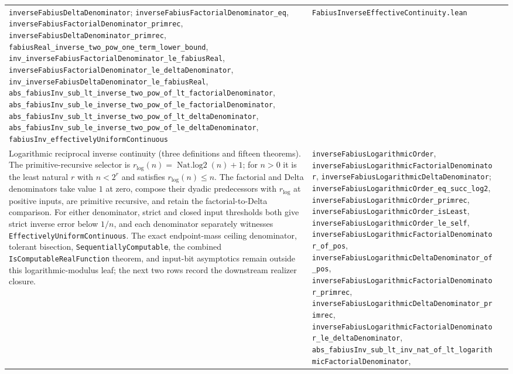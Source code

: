 \documentclass[11pt,oneside]{article}
\theoremstyle{definition}
\theoremstyle{remark}
\begin{document}
\begin{longtable}{@{}p{}p{}p{}@{}}
\nolinkurl{inverseFabiusDeltaDenominator};
\nolinkurl{inverseFabiusFactorialDenominator_eq},
\nolinkurl{inverseFabiusFactorialDenominator_primrec},
\nolinkurl{inverseFabiusDeltaDenominator_primrec},
\nolinkurl{fabiusReal_inverse_two_pow_one_term_lower_bound},
\nolinkurl{inv_inverseFabiusFactorialDenominator_le_fabiusReal},
\nolinkurl{inverseFabiusFactorialDenominator_le_deltaDenominator},
\nolinkurl{inv_inverseFabiusDeltaDenominator_le_fabiusReal},
\nolinkurl{abs_fabiusInv_sub_lt_inverse_two_pow_of_lt_factorialDenominator},
\nolinkurl{abs_fabiusInv_sub_le_inverse_two_pow_of_le_factorialDenominator},
\nolinkurl{abs_fabiusInv_sub_lt_inverse_two_pow_of_lt_deltaDenominator},
\nolinkurl{abs_fabiusInv_sub_le_inverse_two_pow_of_le_deltaDenominator},
\nolinkurl{fabiusInv_effectivelyUniformContinuous} &
\nolinkurl{FabiusInverseEffectiveContinuity.lean} \\
Logarithmic reciprocal inverse continuity (three definitions and fifteen
theorems).  The primitive-recursive selector is
\(r_{\log}(n)=\operatorname{Nat.log2}(n)+1\); for \(n>0\) it is the least
natural \(r\) with \(n<2^r\) and satisfies \(r_{\log}(n)\le n\).  The
factorial and Delta denominators take value \(1\) at zero, compose their
dyadic predecessors with \(r_{\log}\) at positive inputs, are primitive
recursive, and retain the factorial-to-Delta comparison.  For either
denominator, strict and closed input thresholds both give strict inverse error
below \(1/n\), and each denominator separately witnesses
\nolinkurl{EffectivelyUniformContinuous}.  The exact endpoint-mass ceiling
denominator, tolerant bisection, \nolinkurl{SequentiallyComputable}, the
combined \nolinkurl{IsComputableRealFunction} theorem, and input-bit
asymptotics remain outside this logarithmic-modulus leaf; the next two rows
record the downstream realizer closure. &
\nolinkurl{inverseFabiusLogarithmicOrder},
\nolinkurl{inverseFabiusLogarithmicFactorialDenominator},
\nolinkurl{inverseFabiusLogarithmicDeltaDenominator};
\nolinkurl{inverseFabiusLogarithmicOrder_eq_succ_log2},
\nolinkurl{inverseFabiusLogarithmicOrder_primrec},
\nolinkurl{inverseFabiusLogarithmicOrder_isLeast},
\nolinkurl{inverseFabiusLogarithmicOrder_le_self},
\nolinkurl{inverseFabiusLogarithmicFactorialDenominator_of_pos},
\nolinkurl{inverseFabiusLogarithmicDeltaDenominator_of_pos},
\nolinkurl{inverseFabiusLogarithmicFactorialDenominator_primrec},
\nolinkurl{inverseFabiusLogarithmicDeltaDenominator_primrec},
\nolinkurl{inverseFabiusLogarithmicFactorialDenominator_le_deltaDenominator},
\nolinkurl{abs_fabiusInv_sub_lt_inv_nat_of_lt_logarithmicFactorialDenominator},

\end{longtable}
\end{document}
